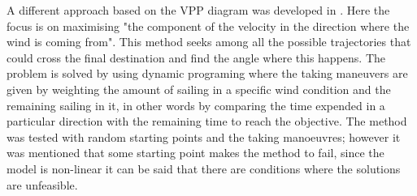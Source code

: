 A different approach based on the VPP diagram was developed in \cite{philpott1993yacht}. Here the focus is on maximising  "the component of the velocity in the direction where the wind is coming from". This method seeks among all the possible trajectories that could cross the final destination and find the angle where this happens. The problem is solved by using dynamic programing where the taking maneuvers are given by  weighting the amount of sailing in a specific wind condition and the remaining  sailing in it, in other words by comparing the time expended in a particular direction with the remaining time to reach the objective. The method was tested with random starting points and the taking manoeuvres; however it was mentioned that some starting point makes the method to fail, since the model is non-linear it can be said that there are conditions  where the solutions are unfeasible. 


